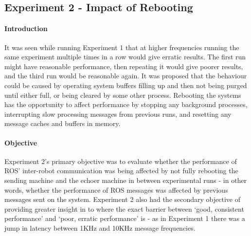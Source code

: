 \documentclass[../dissertation.tex]{subfiles}
\begin{document}
\subsection{Experiment 2 - Impact of Rebooting}
\label{exp-2}

\paragraph{Introduction} It was seen while running Experiment 1 that at higher frequencies running the same experiment multiple times in a row would give erratic results. The first run might have reasonable performance, then repeating it would give poorer results, and the third run would be reasonable again. It was proposed that the behaviour could be caused by operating system buffers filling up and then not being purged until either full, or being cleared by some other process. Rebooting the systems has the opportunity to affect performance by stopping any background processes, interrupting slow processing messages from previous runs, and resetting any message caches and buffers in memory.


\paragraph{Objective} Experiment 2's primary objective was to evaluate whether the performance of ROS' inter-robot communication was being affected by not fully rebooting the sending machine and the echoer machine in between experimental runs - in other words, whether the performance of ROS messages was affected by previous messages sent on the system. Experiment 2 also had the secondary objective of providing greater insight in to where the exact barrier between `good, consistent performance' and `poor, erratic performance' is - as in Experiment 1 there was a jump in latency between 1KHz and 10KHz message frequencies.
\end{document}
